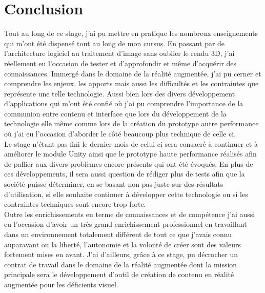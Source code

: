 \chapter{Conclusion}

Tout au long de ce stage, j'ai pu mettre en pratique les nombreux enseignements qui m'ont été dispensé tout au long de mon cursus. En passant par de l'architecture logiciel au traitement d'image sans oublier le rendu 3D, j'ai réellement eu l'occasion de tester et d'approfondir et même d'acquérir des connaissances. Immergé dans le domaine de la réalité augmentée, j'ai pu cerner et comprendre les enjeux, les apports mais aussi les difficultés et les contraintes que représente une telle technologie. Aussi bien lors des divers développement d'applications qui m'ont été confié où j'ai pu comprendre l'importance de la communion entre contenu et interface que lors du développement de la technologie elle même comme lors de la création du prototype autre performance où j'ai eu l'occasion d'aborder le côté beaucoup plus technique de celle ci. \\

Le stage n'étant pas fini le dernier mois de celui ci sera consacré à continuer et à améliorer le module Unity ainsi que le prototype haute performance réalisés afin de pallier aux divers problèmes encore présents qui ont été évoqués. En plus de ces développements, il sera aussi question de rédiger plus de tests afin que la société puisse déterminer, en se basant non pas juste sur des résultats d'utilisation, si elle souhaite continuer à développer cette technologie ou si les contraintes techniques sont encore trop forte.\\

Outre les enrichissements en terme de connaissances et de compétence j'ai aussi eu l'occasion d'avoir un très grand enrichissement professionnel en travaillant dans un environnement totalement différent de tout ce que j'avais connu auparavant ou la liberté, l'autonomie et la volonté de créer sont des valeurs fortement mises en avant.
J'ai d'ailleurs, grâce à ce stage, pu décrocher un contrat de travail dans le domaine de la réalité augmentée dont la mission principale sera le développement d'outil de création de contenu en réalité augmentée pour les déficients visuel.